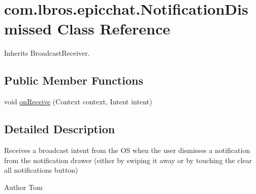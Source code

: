 \hypertarget{classcom_1_1lbros_1_1epicchat_1_1_notification_dismissed}{\section{com.\-lbros.\-epicchat.\-Notification\-Dismissed Class Reference}
\label{classcom_1_1lbros_1_1epicchat_1_1_notification_dismissed}
}


Inherits Broadcast\-Receiver.

\subsection*{Public Member Functions}
\begin{DoxyCompactItemize}
\item 
void \hyperlink{classcom_1_1lbros_1_1epicchat_1_1_notification_dismissed_a5d4c560d0f5108bcaa3cab1b85e3bce5}{on\-Receive} (Context context, Intent intent)
\end{DoxyCompactItemize}


\subsection{Detailed Description}
Receives a broadcast intent from the O\-S when the user dismisses a notification from the notification drawer (either by swiping it away or by touching the clear all notifications button) \begin{DoxyAuthor}{Author}
Tom 
\end{DoxyAuthor}


